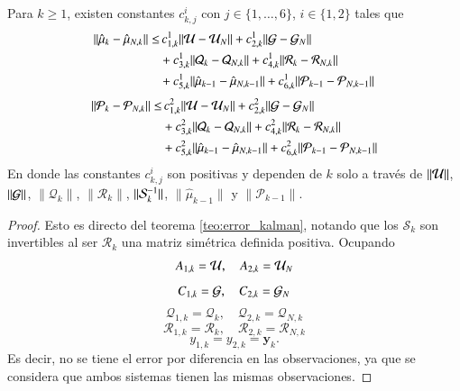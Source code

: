 \begin{prop}
	Para $k \geq 1$, existen constantes $c_{k,j}^i$ con $j \in \{ 1, \dots, 6\}$, $i \in \{ 1, 2\}$ tales que
	\begin{equation*}
		\begin{aligned}
			\| \hat \mu_{k} - \hat \mu_{N,k}  \| \leq & \, c_{1,k}^1 \| \U - \U_N \| +  c_{2,k}^1 \| \G - \G_N \| \\ 
			&+ c_{3,k}^1 \| \mathcal{Q}_{k} - \mathcal{Q}_{N, k} \| +c_{4,k}^1 \| \mathcal{R}_{k} - \mathcal{R}_{N, k} \| \\
			& + c_{5,k}^1 \| \hat \mu_{k-1} - \hat \mu_{N, k-1} \| + c_{6,k}^1 \| \mathcal{P}_{k-1} - \mathcal{P}_{N, k-1} \|
		\end{aligned}
		\label{}
	\end{equation*}
	\begin{equation*}
		\begin{aligned}
			\| \mathcal{P}_{k} - \mathcal{P}_{N,k} \| \leq & \, c_{1,k}^2 \| \U - \U_N \| +  c_{2,k}^2 \| \G - \G_N \| \\ 
			&+ c_{3,k}^2 \| \mathcal{Q}_{k} - \mathcal{Q}_{N, k} \| +c_{4,k}^2 \| \mathcal{R}_{k} - \mathcal{R}_{N, k} \| \\
			& + c_{5,k}^2 \| \hat \mu_{k-1} - \hat \mu_{N, k-1} \| + c_{6,k}^2 \| \mathcal{P}_{k-1} - \mathcal{P}_{N, k-1} \|
		\end{aligned}
	\end{equation*}
	En donde las constantes $c_{k,j}^i$ son positivas y dependen de $k$ solo a través de $\| \U \| $, $\| \G \| $, $\| \mathcal{Q}_{k} \| $, $\| \mathcal{R}_{k} \| $, $\| \S_{k}^{-1} \| $, $\| \hat{\mu}_{k-1} \| $ y $\| \mathcal{P}_{k-1} \| $.
	\label{prop:err_kerKKF_1}
\end{prop}

\begin{proof}
    Esto es directo del teorema \ref{teo:error_kalman}, notando que los $\mathcal{S}_k$ son invertibles al ser $\mathcal{R}_k$ una matriz simétrica definida positiva. Ocupando
    \begin{equation*}
        A_{1,k} = \U, \quad A_{2,k} = \U_N 
    \end{equation*}
    \begin{equation*}
        C_{1,k} = \G, \quad C_{2,k} = \G_N 
    \end{equation*}
    \begin{equation*}
        \mathcal{Q}_{1,k} = \mathcal{Q}_k, \quad \mathcal{Q}_{2,k} = \mathcal{Q}_{N, k}
    \end{equation*}
    \begin{equation*}
        \mathcal{R}_{1,k} = \mathcal{R}_k, \quad \mathcal{R}_{2,k} = \mathcal{R}_{N, k}
    \end{equation*}
    \begin{equation*}
        y_{1, k} = y_{2, k} = \mathbf{y}_k.
    \end{equation*}
    Es decir, no se tiene el error por diferencia en las observaciones, ya que se considera que ambos sistemas tienen las mismas observaciones.
\end{proof}

